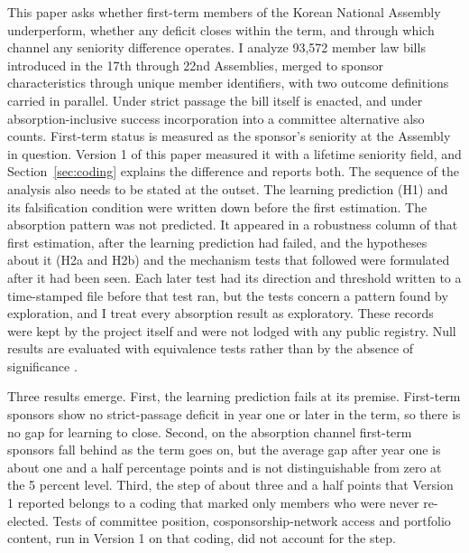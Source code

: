 \documentclass[11pt]{article}
\begin{document}
This paper asks whether first-term members of the Korean National Assembly underperform, whether any deficit closes within the term, and through which channel any seniority difference operates. I analyze 93,572 member law bills introduced in the 17th through 22nd Assemblies, merged to sponsor characteristics through unique member identifiers, with two outcome definitions carried in parallel. Under strict passage the bill itself is enacted, and under absorption-inclusive success incorporation into a committee alternative also counts. First-term status is measured as the sponsor's seniority at the Assembly in question. Version 1 of this paper measured it with a lifetime seniority field, and Section~\ref{sec:coding} explains the difference and reports both. The sequence of the analysis also needs to be stated at the outset. The learning prediction (H1) and its falsification condition were written down before the first estimation. The absorption pattern was not predicted. It appeared in a robustness column of that first estimation, after the learning prediction had failed, and the hypotheses about it (H2a and H2b) and the mechanism tests that followed were formulated after it had been seen. Each later test had its direction and threshold written to a time-stamped file before that test ran, but the tests concern a pattern found by exploration, and I treat every absorption result as exploratory. These records were kept by the project itself and were not lodged with any public registry. Null results are evaluated with equivalence tests rather than by the absence of significance \citep{hartman2018, rainey2014}.

Three results emerge. First, the learning prediction fails at its premise. First-term sponsors show no strict-passage deficit in year one or later in the term, so there is no gap for learning to close. Second, on the absorption channel first-term sponsors fall behind as the term goes on, but the average gap after year one is about one and a half percentage points and is not distinguishable from zero at the 5 percent level. Third, the step of about three and a half points that Version 1 reported belongs to a coding that marked only members who were never re-elected. Tests of committee position, cosponsorship-network access and portfolio content, run in Version 1 on that coding, did not account for the step.
\end{document}
